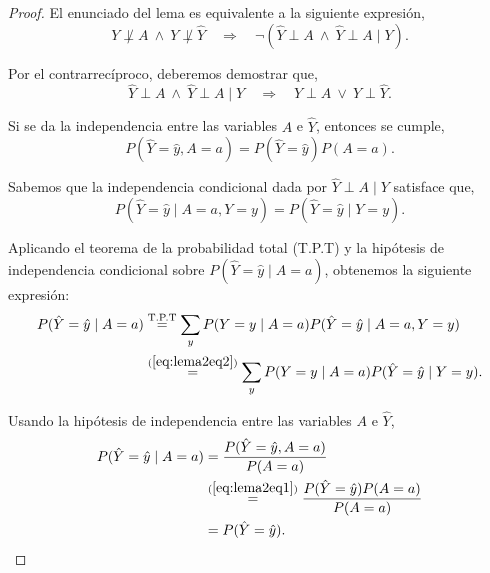 \documentclass[oneside,openright,titlepage,numbers=noenddot,openany,headinclude,footinclude=true,
cleardoublepage=empty,abstractoff,BCOR=5mm,paper=a4,fontsize=12pt,main=spanish]{scrreprt}
\begin{document}
\begin{proof}
El enunciado del lema es equivalente a la siguiente expresión,
\begin{equation*}
Y \not \perp A \ \wedge \ Y \not \perp \hat{Y} \quad \Longrightarrow \quad \neg(\hat{Y} \perp A \ \wedge \ \hat{Y} \perp A \mid Y).
\end{equation*}

Por el contrarrecíproco, deberemos demostrar que,
\begin{equation*}
\hat{Y} \perp A \ \wedge \ \hat{Y} \perp A \mid Y
 \quad \Longrightarrow \quad Y  \perp A \ \vee \ Y  \perp \hat{Y}.
\end{equation*}

Si se da la independencia entre las variables $A$ e $\hat{Y}$, entonces se cumple,
\begin{equation}\label{eq:lema2eq1}
P(\hat{Y}=\hat{y},A=a)=P(\hat{Y}=\hat{y})P(A=a).
\end{equation}

Sabemos que la independencia condicional dada por $\hat{Y} \perp A \mid Y$ satisface que,
\begin{equation}\label{eq:lema2eq2}
P(\hat{Y}=\hat{y} \mid A=a, Y=y)=P(\hat{Y}=\hat{y} \mid Y=y).
\end{equation}

Aplicando el teorema de la probabilidad total (T.P.T) y la hipótesis de independencia condicional sobre $P(\hat{Y}=\hat{y} \mid A=a)$, obtenemos la siguiente expresión:
\begin{equation}\label{eq:lema2eq3}
\begin{split}
P(\hat{Y}=\hat{y} \mid A=a) &\overset{\text{T.P.T}}{=} \sum_{y} P(Y=y \mid A=a) P(\hat{Y}=\hat{y} \mid A=a, Y=y)\\
&\overset{(\ref{eq:lema2eq2})}{=} \sum_{y} P(Y=y \mid A=a)P(\hat{Y}=\hat{y} \mid Y=y).
\end{split}
\end{equation}

Usando la hipótesis de independencia entre las variables $A$ e $\hat{Y}$,
\begin{equation}\label{eq:lema2eq4}
\begin{split}
P(\hat{Y}=\hat{y} \mid A=a) &= \frac{\displaystyle P(\hat{Y}=\hat{y},A=a)}{\displaystyle P(A=a)}\\ &\overset{(\ref{eq:lema2eq1})}{=} \frac{\displaystyle P(\hat{Y}=\hat{y})P(A=a)}{\displaystyle P(A=a)}\\
&= P(\hat{Y}=\hat{y}).
\end{split}
\end{equation}


\end{proof}
\end{document}
